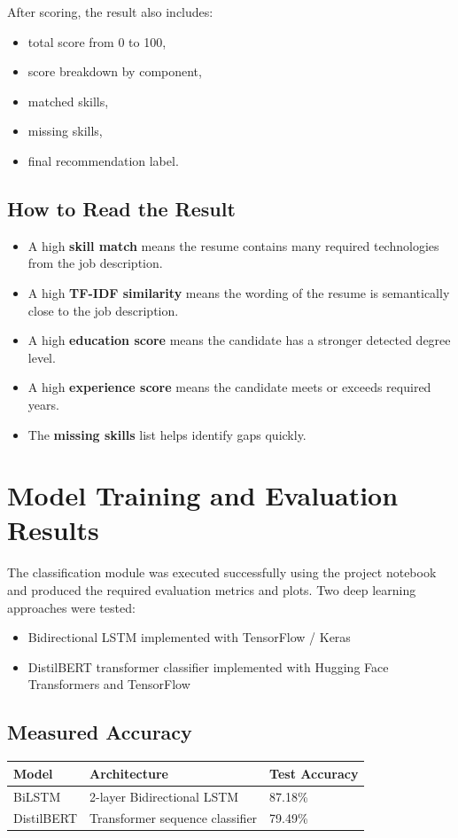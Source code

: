 \documentclass[12pt,a4paper]{article}
\begin{document}
After scoring, the result also includes:

\begin{itemize}[leftmargin=1.5em]
    \item total score from 0 to 100,
    \item score breakdown by component,
    \item matched skills,
    \item missing skills,
    \item final recommendation label.
\end{itemize}

\subsection{How to Read the Result}
\begin{itemize}[leftmargin=1.5em]
    \item A high \textbf{skill match} means the resume contains many required technologies from the job description.
    \item A high \textbf{TF-IDF similarity} means the wording of the resume is semantically close to the job description.
    \item A high \textbf{education score} means the candidate has a stronger detected degree level.
    \item A high \textbf{experience score} means the candidate meets or exceeds required years.
    \item The \textbf{missing skills} list helps identify gaps quickly.
\end{itemize}

\section{Model Training and Evaluation Results}
The classification module was executed successfully using the project notebook and produced the required evaluation metrics and plots. Two deep learning approaches were tested:

\begin{itemize}[leftmargin=1.5em]
    \item Bidirectional LSTM implemented with TensorFlow / Keras
    \item DistilBERT transformer classifier implemented with Hugging Face Transformers and TensorFlow
\end{itemize}

\subsection{Measured Accuracy}
\begin{longtable}{p{4.2cm}p{5cm}p{4cm}}
\toprule
\textbf{Model} & \textbf{Architecture} & \textbf{Test Accuracy} \\
\midrule
BiLSTM & 2-layer Bidirectional LSTM & 87.18\% \\
DistilBERT & Transformer sequence classifier & 79.49\% \\
\bottomrule
\end{longtable}
\end{document}
